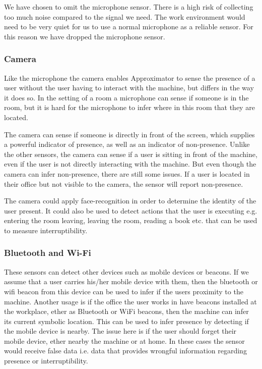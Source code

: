 \documentclass{sigchi}
\begin{document}
We have chosen to omit the microphone sensor.
There is a high risk of collecting too much noise compared to the signal we need.
The work environment would need to be very quiet for us to use a normal microphone as a reliable sensor.
For this reason we have dropped the microphone sensor.

\subsubsection{Camera}
Like the microphone the camera enables Approximator to sense the presence of a user without the user having to interact with the machine, but differs in the way it does so.
In the setting of a room a microphone can sense if someone is in the room, but it is hard for the microphone to infer where in this room that they are located.

The camera can sense if someone is directly in front of the screen, which supplies a powerful indicator of presence, as well as an indicator of non-presence.
Unlike the other sensors, the camera can sense if a user is sitting in front of the machine, even if the user is not directly interacting with the machine.
But even though the camera can infer non-presence, there are still some issues.
If a user is located in their office but not visible to the camera, the sensor will report non-presence.

The camera could apply face-recognition in order to determine the identity of the user present.
It could also be used to detect actions that the user is executing e.g. entering the room leaving, leaving the room, reading a book etc. that can be used to measure interruptibility.

\subsubsection{Bluetooth and Wi-Fi}
These sensors can detect other devices such as mobile devices or beacons.
If we assume that a user carries his/her mobile device with them, then the bluetooth or wifi beacon from this device can be used to infer if the users proximity to the machine.
Another usage is if the office the user works in have beacons installed at the workplace, ether as Bluetooth or WiFi beacons, then the machine can infer its current symbolic location.
This can be used to infer presence by detecting if the mobile device is nearby.
The issue here is if the user should forget their mobile device, ether nearby the machine or at home.
In these cases the sensor would receive false data i.e. data that provides wrongful information regarding presence or interruptibility.
\end{document}
